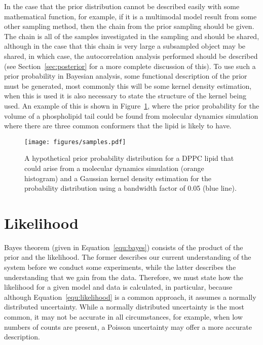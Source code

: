 \documentclass[reprint,superscriptaddress,aps,amsmath,linenumbers]{revtex4-2}
\begin{document}
In the case that the prior distribution cannot be described easily with some mathematical function, for example, if it is a multimodal model result from some other sampling method, then the chain from the prior sampling should be given. 
The chain is all of the samples investigated in the sampling and should be shared, although in the case that this chain is very large a subsampled object may be shared, in which case, the autocorrelation analysis performed should be described (see Section~\ref{sec:posterior} for a more complete discussion of this).
To use such a prior probability in Bayesian analysis, some functional description of the prior must be generated, most commonly this will be some kernel density estimation, when this is used it is also necessary to state the structure of the kernel being used. 
An example of this is shown in Figure~\ref{fig:samples}, where the prior probability for the volume of a phospholipid tail could be found from molecular dynamics simulation where there are three common conformers that the lipid is likely to have.
%
\begin{figure}
  \texttt{[image: figures/samples.pdf]}
  \caption{
    A hypothetical prior probability distribution for a DPPC lipid that could arise from a molecular dynamics simulation (orange histogram) and a Gaussian kernel density estimation for the probability distribution using a bandwidth factor of \num{0.05} (blue line). 
  }
  \label{fig:samples}
\end{figure}
%

\section{Likelihood}
\label{sec:likelihood}

Bayes theorem (given in Equation~\ref{equ:bayes}) consists of the product of the prior and the likelihood. 
The former describes our current understanding of the system before we conduct some experiments, while the latter describes the understanding that we gain from the data. 
Therefore, we must state how the likelihood for a given model and data is calculated, in particular, because although Equation~\ref{equ:likelihood} is a common approach, it assumes a normally distributed uncertainty. 
While a normally distributed uncertainty is the most common, it may not be accurate in all circumstances, for example, when low numbers of counts are present, a Poisson uncertainty may offer a more accurate description. 
\end{document}
